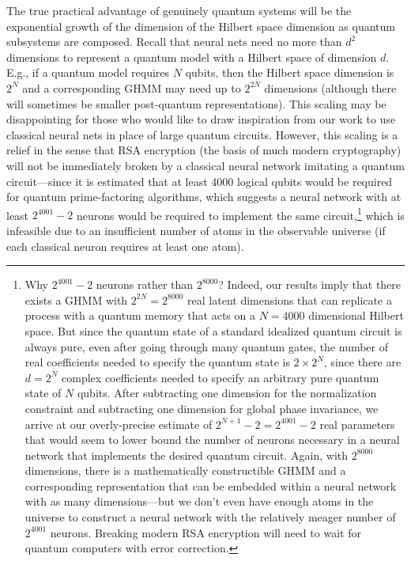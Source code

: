 \documentclass[prx,nofootinbib,onecolumn,showkeys,groupaddress,preprintnumbers,floatfix,
superscriptaddress]{revtex4-1}
\begin{document}
The true practical advantage of genuinely quantum systems will be the exponential growth of the dimension of the Hilbert space dimension as quantum subsystems are composed.  
Recall that neural nets need no more than $d^2$ dimensions to represent a quantum model with a Hilbert space of dimension $d$.  E.g., if a quantum model requires $N$ qubits, then the Hilbert space dimension is $2^N$ and a corresponding GHMM may need up to $2^{2N}$ dimensions (although there will sometimes be smaller post-quantum representations).
This scaling may be disappointing for those who would like to 
draw inspiration from our work to
use classical neural nets in place of large quantum circuits.
However, this scaling is a relief
in the sense that RSA encryption (the basis of much modern cryptography) will not be immediately broken by a classical neural network imitating a quantum circuit---since it is estimated that at least 4000 logical qubits would be required for quantum prime-factoring algorithms, which suggests a neural network with at least $2^{4001} - 2$ neurons would be required to implement the same circuit,\footnote{Why $2^{4001} - 2$ neurons
rather than $2^{8000}$?  Indeed, our results imply that there exists a GHMM with $2^{2N} = 2^{8000}$ real latent dimensions that can replicate a process with a quantum memory that acts on a $N=4000$ dimensional Hilbert space.  But since the quantum state of a standard idealized quantum circuit is always pure, even after going through many quantum gates, the number of real coefficients needed to specify the quantum state is $2\times 2^N$, since there are $d = 2^N$ complex coefficients needed to specify an arbitrary pure quantum state of $N$ qubits.  After subtracting one dimension for the normalization constraint and subtracting one dimension for global phase invariance, we arrive at our overly-precise estimate of $2^{N+1} - 2 = 2^{4001} - 2$ real parameters that would seem to lower bound the number of neurons necessary in a neural network that implements the desired quantum circuit.  Again, with $2^{8000}$ dimensions, there is a mathematically constructible GHMM and a corresponding representation that can be embedded within a neural network with as many dimensions---but we don't even have enough atoms in the universe to construct a neural network with 
the relatively meager number of $2^{4001}$ neurons.  Breaking modern RSA encryption will need to wait for quantum computers with error correction.} which is infeasible due to an insufficient number of atoms in the observable universe (if each classical neuron requires at least one atom).
\end{document}
